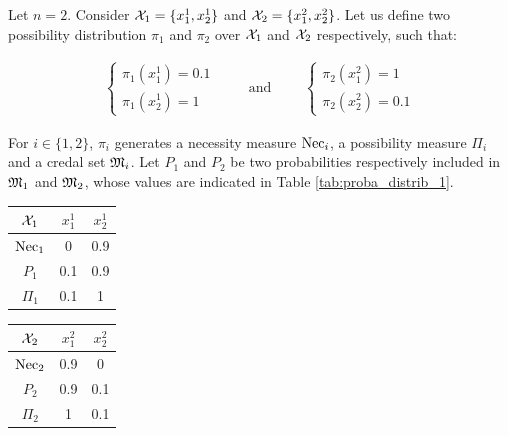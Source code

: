 \begin{example}\label{ex:necessity}
    Let $n=2$. Consider ${\mathcal{X}}_1=\{x^1_1, x^1_2\}$ and ${\mathcal{X}}_2=\{x^2_1, x^2_2\}$. Let us define two possibility distribution $\pi_1$ and $\pi_2$ over ${\mathcal{X}}_1$ and ${\mathcal{X}}_2$ respectively, such that:

    \begin{eqnarray*}
    \begin{cases}
        \pi_1(x^1_1) = 0.1\\
        \pi_1(x^1_2) = 1
    \end{cases}
    \qquad\text{ and }\qquad
    \begin{cases}
        \pi_2(x^2_1)=1\\
        \pi_2(x^2_2)=0.1
    \end{cases}
    \end{eqnarray*}
    
    For $i\in\{1,2\}$, $\pi_i$ generates a necessity measure ${\mathrm{Nec}}_i$, a possibility measure $\Pi_i$ and a credal set ${\mathfrak{M}}_i$. Let $P_1$ and $P_2$ be two probabilities respectively included in ${\mathfrak{M}}_1$ and ${\mathfrak{M}}_2$,  whose values are indicated in Table \ref{tab:proba_distrib_1}. 
    
    \begin{center}
    \begin{tabular}{|c|c|c|}
        \hline
        ${\mathcal{X}}_1$ & $x^1_1$ & $x^1_2$\\
        \hline\hline
        ${\mathrm{Nec}}_1$ & 0 & 0.9\\
        \hline
        $P_1$  & 0.1 & 0.9\\
        \hline
        $\Pi_1$ & 0.1 & 1\\
        \hline
    \end{tabular}
    \quad
    \begin{tabular}{|c|c|c|}
        \hline
        ${\mathcal{X}}_2$ & $x^2_1$ & $x^2_2$\\
        \hline\hline
        ${\mathrm{Nec}}_2$ & 0.9 & 0\\
        \hline
        $P_2$  & 0.9 & 0.1\\
        \hline
        $\Pi_2$ & 1 & 0.1\\
        \hline
    \end{tabular}
    \label{tab:proba_distrib_1}
    \end{center}


\end{example}

